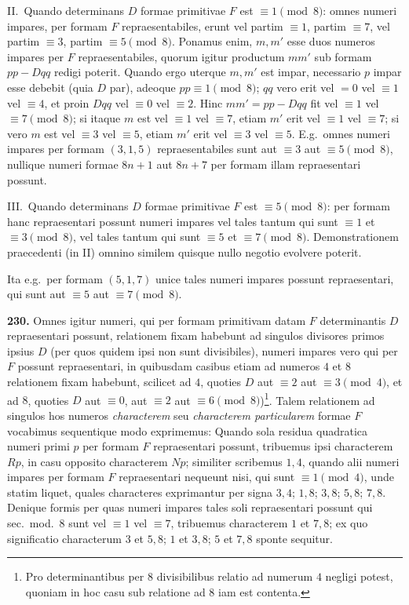 \documentclass[12pt,a4paper]{article}
\theoremstyle{plain}
\theoremstyle{definition}
\theoremstyle{remark}
\begin{document}
II.\ Quando determinans $D$ formae primitivae $F$ est $\equiv1\pmod8$: omnes numeri impares, per formam $F$ repraesentabiles, erunt vel partim $\equiv1$, partim $\equiv7$, vel partim $\equiv3$, partim $\equiv5\pmod8$. Ponamus enim, $m,m'$ esse duos numeros impares per $F$ repraesentabiles, quorum igitur productum $mm'$ sub formam $pp-Dqq$ redigi poterit. Quando ergo uterque $m,m'$ est impar, necessario $p$ impar esse debebit (quia $D$ par), adeoque $pp\equiv1\pmod8$; $qq$ vero erit vel $=0$ vel $\equiv1$ vel $\equiv4$, et proin $Dqq$ vel $\equiv0$ vel $\equiv2$. Hinc $mm'=pp-Dqq$ fit vel $\equiv1$ vel $\equiv7\pmod8$; si itaque $m$ est vel $\equiv1$ vel $\equiv7$, etiam $m'$ erit vel $\equiv1$ vel $\equiv7$; si vero $m$ est vel $\equiv3$ vel $\equiv5$, etiam $m'$ erit vel $\equiv3$ vel $\equiv5$. E.g.\ omnes numeri impares per formam $(3,1,5)$ repraesentabiles sunt aut $\equiv3$ aut $\equiv5\pmod8$, nullique numeri formae $8n+1$ aut $8n+7$ per formam illam repraesentari possunt.

III.\ Quando determinans $D$ formae primitivae $F$ est $\equiv5\pmod8$: per formam hanc repraesentari possunt numeri impares vel tales tantum qui sunt $\equiv1$ et $\equiv3\pmod8$, vel tales tantum qui sunt $\equiv5$ et $\equiv7\pmod8$. Demonstrationem praecedenti (in II) omnino similem quisque nullo negotio evolvere poterit.

Ita e.g.\ per formam $(5,1,7)$ unice tales numeri impares possunt repraesentari, qui sunt aut $\equiv5$ aut $\equiv7\pmod8$.

\textbf{230.}
Omnes igitur numeri, qui per formam primitivam datam $F$ determinantis $D$ repraesentari possunt, relationem fixam habebunt ad singulos divisores primos ipsius $D$ (per quos quidem ipsi non sunt divisibiles), numeri impares vero qui per $F$ possunt repraesentari, in quibusdam casibus etiam ad numeros $4$ et $8$ relationem fixam habebunt, scilicet ad $4$, quoties $D$ aut $\equiv2$ aut $\equiv3\pmod4$, et ad $8$, quoties $D$ aut $\equiv0$, aut $\equiv2$ aut $\equiv6\pmod8$)\footnote{Pro determinantibus per $8$ divisibilibus relatio ad numerum $4$ negligi potest, quoniam in hoc casu sub relatione ad $8$ iam est contenta.}. Talem relationem ad singulos hos numeros \emph{characterem} seu \emph{characterem particularem} formae $F$ vocabimus sequentique modo exprimemus: Quando sola residua quadratica numeri primi $p$ per formam $F$ repraesentari possunt, tribuemus ipsi characterem $Rp$, in casu opposito characterem $Np$; similiter scribemus $1,4$, quando alii numeri impares per formam $F$ repraesentari nequeunt nisi, qui sunt $\equiv1\pmod4$, unde statim liquet, quales characteres exprimantur per signa $3,4$; $1,8$; $3,8$; $5,8$; $7,8$. Denique formis per quas numeri impares tales soli repraesentari possunt qui sec.\ mod.\ $8$ sunt vel $\equiv1$ vel $\equiv7$, tribuemus characterem $1$ et $7,8$; ex quo significatio characterum $3$ et $5,8$; $1$ et $3,8$; $5$ et $7,8$ sponte sequitur.
\end{document}
